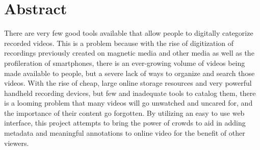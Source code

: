 %
\chapter*{Abstract}
\label{sec:abstract}
\vspace*{-10mm}






There are very few good tools available that allow people to digitally categorize recorded videos.  This is a problem because with the rise of digitization of recordings previously created on magnetic media and other media as well as the profileration of smartphones, there is an ever-growing volume of videos being made available to people, but a severe lack of ways to organize and search those videos.  With the rise of cheap, large online storage resources and very powerful handheld recording devices, but few and inadequate tools to catalog them, there is a looming problem that many videos will go unwatched and uncared for, and the importance of their content go forgotten. By utilizing an easy to use web interface, this project attempts to bring the power of crowds to aid in adding metadata and meaningful annotations to online video for the benefit of other viewers. 



